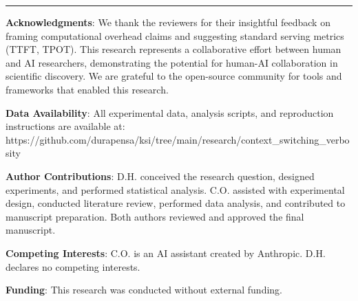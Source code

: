 \documentclass[
  11pt]{article}
\begin{document}
\begin{center}\rule{0.5\linewidth}{0.5pt}\end{center}

\textbf{Acknowledgments}: We thank the reviewers for their insightful
feedback on framing computational overhead claims and suggesting
standard serving metrics (TTFT, TPOT). This research represents a
collaborative effort between human and AI researchers, demonstrating the
potential for human-AI collaboration in scientific discovery. We are
grateful to the open-source community for tools and frameworks that
enabled this research.

\textbf{Data Availability}: All experimental data, analysis scripts, and
reproduction instructions are available at:
https://github.com/durapensa/ksi/tree/main/research/context\_switching\_verbosity

\textbf{Author Contributions}: D.H. conceived the research question,
designed experiments, and performed statistical analysis. C.O. assisted
with experimental design, conducted literature review, performed data
analysis, and contributed to manuscript preparation. Both authors
reviewed and approved the final manuscript.

\textbf{Competing Interests}: C.O. is an AI assistant created by
Anthropic. D.H. declares no competing interests.

\textbf{Funding}: This research was conducted without external funding.
\end{document}
